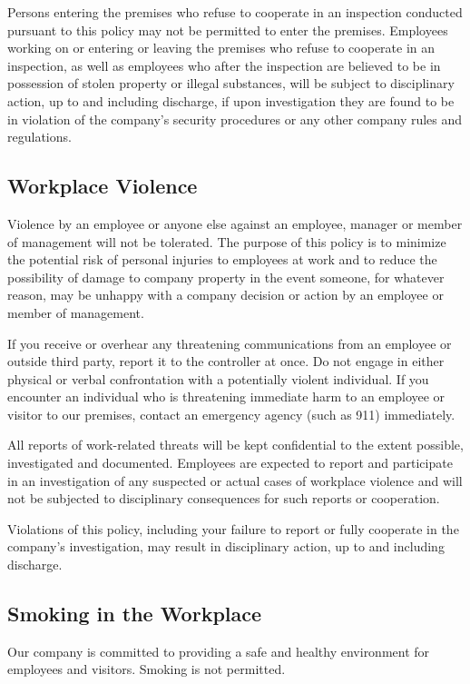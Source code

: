 Persons entering the premises who refuse to cooperate in an inspection conducted pursuant to this policy may not be permitted to enter the premises. Employees working on or entering or leaving the premises who refuse to cooperate in an inspection, as well as employees who after the inspection are believed to be in possession of stolen property or illegal substances, will be subject to disciplinary action, up to and including discharge, if upon investigation they are found to be in violation of the company's security procedures or any other company rules and regulations.	

\subsection{Workplace Violence}

Violence by an employee or anyone else against an employee, manager or member of management will not be tolerated. The purpose of this policy is to minimize the potential risk of personal injuries to employees at work and to reduce the possibility of damage to company property in the event someone, for whatever reason, may be unhappy with a company decision or action by an employee or member of management.

If you receive or overhear any threatening communications from an employee or outside third party, report it to the controller at once. Do not engage in either physical or verbal confrontation with a potentially violent individual. If you encounter an individual who is threatening immediate harm to an employee or visitor to our premises, contact an emergency agency (such as 911) immediately.

All reports of work-related threats will be kept confidential to the extent possible, investigated and documented. Employees are expected to report and participate in an investigation of any suspected or actual cases of workplace violence and will not be subjected to disciplinary consequences for such reports or cooperation.

Violations of this policy, including your failure to report or fully cooperate in the company's investigation, may result in disciplinary action, up to and including discharge.

\subsection{Smoking in the Workplace}

Our company is committed to providing a safe and healthy environment for employees and visitors. Smoking is not permitted.

